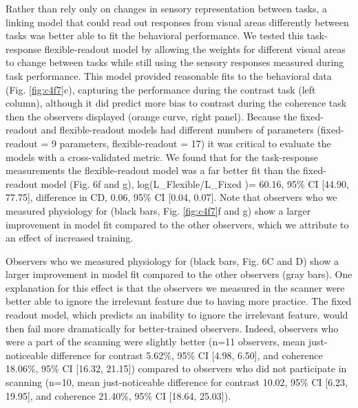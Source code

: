 \documentclass{report}
\begin{document}
Rather than rely only on changes in sensory representation between tasks, a linking model that could read out responses from visual areas differently between tasks was better able to fit the behavioral performance. We tested this task-response flexible-readout model by allowing the weights for different visual areas to change between tasks while still using the sensory responses measured during task performance. This model provided reasonable fits to the behavioral data (Fig. \ref{fig:c4f7}c), capturing the performance during the contrast task (left column), although it did predict more bias to contrast during the coherence task then the observers displayed (orange curve, right panel). Because the fixed-readout and flexible-readout models had different numbers of parameters (fixed-readout = 9 parameters, flexible-readout = 17) it was critical to evaluate the models with a cross-validated metric. We found that for the task-response measurements the flexible-readout model was a far better fit than the fixed-readout model (Fig. 6f and g), log⁡(L_Flexible/L_Fixed )= 60.16, 95\% CI [44.90, 77.75], difference in CD, 0.06, 95\% CI [0.04, 0.07]. Note that observers who we measured physiology for (black bars, Fig. \ref{fig:c4f7}f and g) show a larger improvement in model fit compared to the other observers, which we attribute to an effect of increased training.

Observers who we measured physiology for (black bars, Fig. 6C and D) show a larger improvement in model fit compared to the other observers (gray bars). One explanation for this effect is that the observers we measured in the scanner were better able to ignore the irrelevant feature due to having more practice. The fixed readout model, which predicts an inability to ignore the irrelevant feature, would then fail more dramatically for better-trained observers. Indeed, observers who were a part of the scanning were slightly better (n=11 observers, mean just-noticeable difference for contrast 5.62\%, 95\% CI [4.98, 6.50], and coherence 18.06\%, 95\% CI [16.32, 21.15]) compared to observers who did not participate in scanning (n=10, mean just-noticeable difference for contrast 10.02, 95\% CI [6.23, 19.95], and coherence 21.40\%, 95\% CI [18.64, 25.03]). 
\end{document}
